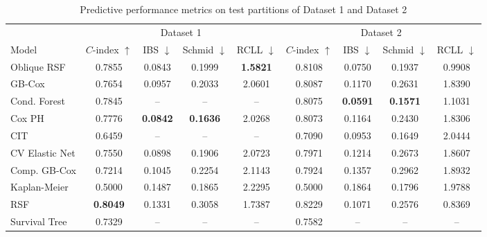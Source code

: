 \documentclass[pdflatex,sn-mathphys-ay]{sn-jnl}
\theoremstyle{thmstyleone}%
\theoremstyle{thmstyletwo}%
\theoremstyle{thmstylethree}%
\begin{document}
\begin{table}
\centering
\small
\caption{Predictive performance metrics on test partitions of Dataset 1 and Dataset 2}\label{tab:performance_comparison}
\begin{tabular*}{\textwidth}{@{\extracolsep{\fill}} lcccccccc}
\toprule
& \multicolumn{4}{c}{Dataset 1} & \multicolumn{4}{c}{Dataset 2} \\
\cmidrule(lr){2-5} \cmidrule(lr){6-9}
Model & $C$-index $\uparrow$ & IBS $\downarrow$ & Schmid $\downarrow$ & RCLL $\downarrow$ & $C$-index $\uparrow$ & IBS $\downarrow$ & Schmid $\downarrow$ & RCLL $\downarrow$ \\
\midrule
\quad Oblique RSF & 0.7855 & 0.0843 & 0.1999 & \textbf{1.5821} & 0.8108 & 0.0750 & 0.1937 & 0.9908 \\
\quad GB-Cox & 0.7654 & 0.0957 & 0.2033 & 2.0601 & 0.8087 & 0.1170 & 0.2631 & 1.8390 \\
\quad Cond. Forest & 0.7845 & -- & -- & -- & 0.8075 & \textbf{0.0591} & \textbf{0.1571} & 1.1031 \\
\quad Cox PH & 0.7776 & \textbf{0.0842} & \textbf{0.1636} & 2.0268 & 0.8073 & 0.1164 & 0.2430 & 1.8306 \\
\quad CIT & 0.6459 & -- & -- & -- & 0.7090 & 0.0953 & 0.1649 & 2.0444 \\
\quad CV Elastic Net & 0.7550 & 0.0898 & 0.1906 & 2.0723 & 0.7971 & 0.1214 & 0.2673 & 1.8607 \\
\quad Comp. GB-Cox & 0.7214 & 0.1045 & 0.2254 & 2.1143 & 0.7924 & 0.1357 & 0.2962 & 1.8932 \\
\quad Kaplan-Meier & 0.5000 & 0.1487 & 0.1865 & 2.2295 & 0.5000 & 0.1864 & 0.1796 & 1.9788 \\
\quad RSF & \textbf{0.8049} & 0.1331 & 0.3058 & 1.7387 & 0.8229 & 0.1071 & 0.2576 & 0.8369 \\
\quad Survival Tree & 0.7329 & -- & -- & -- & 0.7582 & -- & -- & -- \\
\bottomrule
\end{tabular*}
\end{table}
\end{document}
